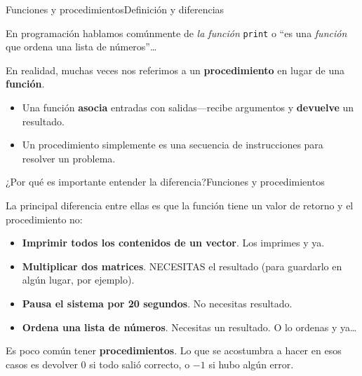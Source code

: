 \documentclass[spanish, c]{beamer}
\begin{document}
\begin{frame}{Funciones y procedimientos}{Definición y diferencias}

    En programación hablamos comúnmente de \textit{la función} \texttt{print} o ``es una \textit{función} que ordena una lista de números''\dots \pause

    \bigskip

    En realidad, muchas veces nos referimos a un \textbf{procedimiento} en lugar de una \textbf{función}. \pause

    \bigskip

    \begin{itemize}
        \itemsep2.5ex
        \item Una \alert{función} \textbf{asocia} entradas con salidas---recibe argumentos y \textbf{devuelve} un resultado. \pause
        \item Un \alert{procedimiento} simplemente es una secuencia de instrucciones para resolver un problema. \pause
    \end{itemize}    

\end{frame}

\begin{frame}{¿Por qué es importante entender la diferencia?}{Funciones y procedimientos}

    La principal diferencia entre ellas es que la función tiene un \alert{valor de retorno} y el procedimiento no: \pause

    \bigskip

    \begin{itemize}
        \item \textbf{Imprimir todos los contenidos de un vector}. Los imprimes y ya. \pause
        \item \textbf{Multiplicar dos matrices}. NECESITAS el resultado (para guardarlo en algún lugar, por ejemplo). \pause
        \item \textbf{Pausa el sistema por 20 segundos}. No necesitas resultado. \pause
        \item \textbf{Ordena una lista de números}. Necesitas un resultado. O lo ordenas y ya\dots \pause
    \end{itemize}

    \bigskip

    Es poco común tener \textbf{procedimientos}. Lo que se acostumbra a hacer en esos casos es devolver $0$ si todo salió correcto, o $-1$ si hubo algún error.

\end{frame}
\end{document}

